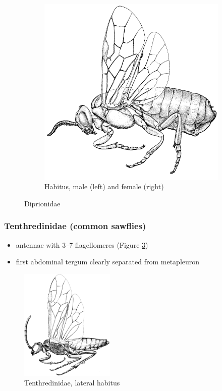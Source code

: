 \documentclass[letterpaper, 11pt]{article}
\begin{document}
\begin{figure}[ht!]
\begin{subfigure}[ht!]{0.45\textwidth}
        \includegraphics[width=\textwidth]{DiprionidHabitus}
        \caption{Habitus, male (left) and female (right)}
        \label{fig:diprionid2}
    \end{subfigure}
    \caption{Diprionidae \citep[][pg. 108 (a) and Fig. 29 (b)]{goulet1993hymenoptera}}\label{fig:diprion}
\end{figure}

\subsubsection{Tenthredinidae (common sawflies)}
\begin{itemize}
\item antennae with 3--7 flagellomeres (Figure \ref{fig:tenthred1})
\item first abdominal tergum clearly separated from metapleuron
\end{itemize}

\begin{figure}[ht!]
  \centering
    \includegraphics[width=0.4\textwidth]{TenthredinidHabitus}
  \caption{Tenthredinidae, lateral habitus \citep[][Fig. 31]{goulet1993hymenoptera}}
  \label{fig:tenthred1}
\end{figure}
\end{document}
